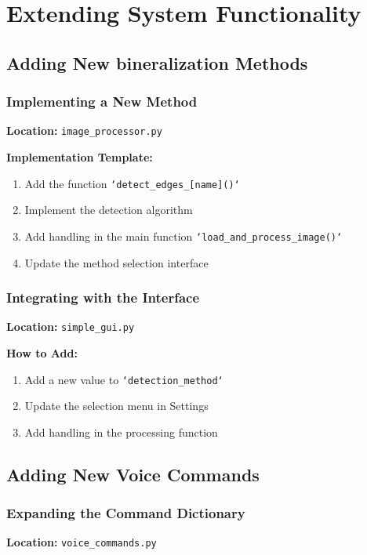 \documentclass[a4paper,12pt]{article}
\begin{document}
\section{Extending System Functionality}

\subsection{Adding New bineralization Methods}

\subsubsection{Implementing a New Method}
\textbf{Location:} \texttt{image\_processor.py}

\textbf{Implementation Template:}
\begin{enumerate}
\item Add the function \texttt{`detect\_edges\_[name]()`}
\item Implement the detection algorithm
\item Add handling in the main function \texttt{`load\_and\_process\_image()`}
\item Update the method selection interface
\end{enumerate}

\subsubsection{Integrating with the Interface}
\textbf{Location:} \texttt{simple\_gui.py}

\textbf{How to Add:}
\begin{enumerate}
\item Add a new value to \texttt{`detection\_method`}
\item Update the selection menu in Settings
\item Add handling in the processing function
\end{enumerate}

\subsection{Adding New Voice Commands}

\subsubsection{Expanding the Command Dictionary}
\textbf{Location:} \texttt{voice\_commands.py}
\end{document}
